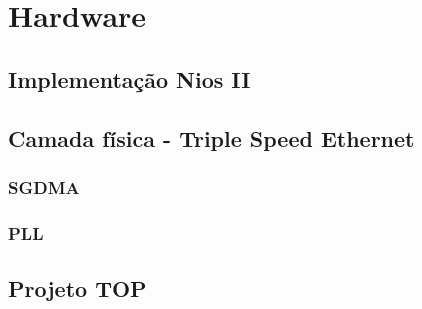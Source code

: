 \chapter{Hardware}


\section{Implementação Nios II}

\section{Camada física - Triple Speed Ethernet}

\subsection{SGDMA}

\subsection{PLL}

\section{Projeto TOP}

